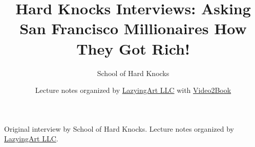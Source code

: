 \documentclass[11pt,oneside]{book}
\begin{document}
\frontmatter
\title{Hard Knocks Interviews: Asking San Francisco Millionaires How They Got Rich!}
\author{School of Hard Knocks}
\date{Lecture notes organized by \href{https://lazying.art}{LazyingArt LLC} with \href{https://github.com/lachlanchen/Video2Book}{Video2Book}}
\maketitle
\begin{center}
\small Original interview by School of Hard Knocks. Lecture notes organized by \href{https://lazying.art}{LazyingArt LLC}.
\end{center}
\clearpage
\mainmatter

\end{document}
